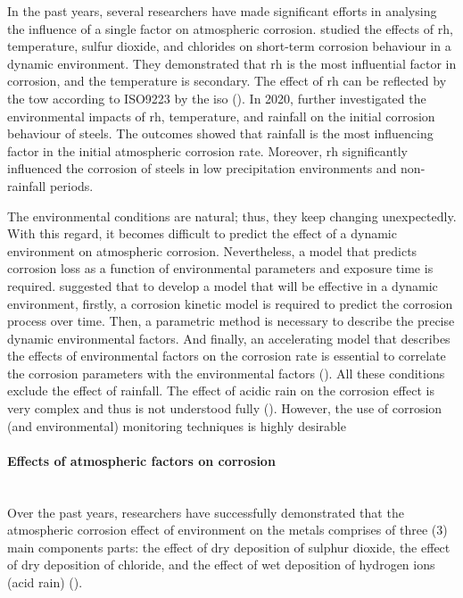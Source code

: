 In the past years, several researchers have made significant efforts in analysing the influence of a single factor on atmospheric corrosion. \cite{cai2018influence} studied the effects of \acrshort{rh}, temperature, sulfur dioxide, and chlorides on short-term corrosion behaviour in a dynamic environment. They demonstrated that \acrshort{rh} is the most influential factor in corrosion, and the temperature is secondary. The effect of \acrshort{rh} can be reflected by the \acrfull{tow} according to ISO9223 by the \Acrfull{iso} (\cite{cengel1998heat, islam2018effects}). In 2020, \cite{pei2021understanding} further investigated the environmental impacts of \acrshort{rh}, temperature, and rainfall on the initial corrosion behaviour of steels. The outcomes showed that rainfall is the most influencing factor in the initial atmospheric corrosion rate.  Moreover, \acrshort{rh} significantly influenced the corrosion of steels in low precipitation environments and non-rainfall periods.

The environmental conditions are natural; thus, they keep changing unexpectedly. With this regard, it becomes difficult to predict the effect of a dynamic environment on atmospheric corrosion. Nevertheless, a model that predicts corrosion loss as a function of environmental parameters and exposure time is required. \cite{cai2018influence} suggested that to develop a model that will be effective in a dynamic environment, firstly, a corrosion kinetic model is required to predict the corrosion process over time. Then, a parametric method is necessary to describe the precise dynamic environmental factors. And finally, an accelerating model that describes the effects of environmental factors on the corrosion rate is essential to correlate the corrosion parameters with the environmental factors (\cite{loto2019performance}). All these conditions exclude the effect of rainfall. The effect of acidic rain on the corrosion effect is very complex and thus is not understood fully (\cite{pei2021understanding}). However, the use of corrosion (and environmental) monitoring techniques is highly desirable

\paragraph{Effects of atmospheric factors on corrosion} \hfill \\
Over the past years, researchers have successfully demonstrated that the atmospheric corrosion effect of environment on the metals comprises of three (3) main components parts: the effect of dry deposition of sulphur dioxide, the effect of dry deposition of chloride, and the effect of wet deposition of hydrogen ions (acid rain) (\cite{cai2018influence}).

